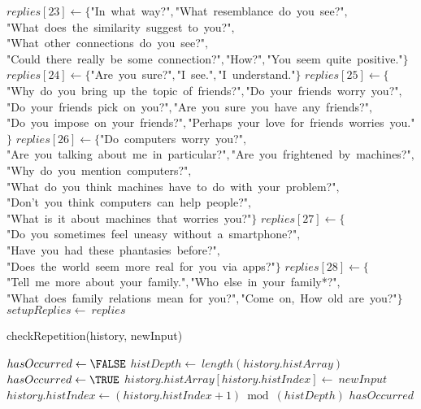 \documentclass[a4paper,10pt]{article}
\begin{document}
\begin{algorithm}
\begin{algorithmic}[5]
  \STATE \(replies[23]\gets\{\)"{}In\ what\ way?"{}\(,\)"{}What\ resemblance\ do\ you\ see?"{}\(,\)"{}What\ does\ the\ similarity\ suggest\ to\ you?"{}\(,\)"{}What\ other\ connections\ do\ you\ see?"{}\(,\)"{}Could\ there\ really\ be\ some\ connection?"{}\(,\)"{}How?"{}\(,\)"{}You\ seem\ quite\ positive."{}\(\}\)
  \STATE \(replies[24]\gets\{\)"{}Are\ you\ sure?"{}\(,\)"{}I\ see."{}\(,\)"{}I\ understand."{}\(\}\)
  \STATE \(replies[25]\gets\{\)"{}Why\ do\ you\ bring\ up\ the\ topic\ of\ friends?"{}\(,\)"{}Do\ your\ friends\ worry\ you?"{}\(,\)"{}Do\ your\ friends\ pick\ on\ you?"{}\(,\)"{}Are\ you\ sure\ you\ have\ any\ friends?"{}\(,\)"{}Do\ you\ impose\ on\ your\ friends?"{}\(,\)"{}Perhaps\ your\ love\ for\ friends\ worries\ you."{}\(\}\)
  \STATE \(replies[26]\gets\{\)"{}Do\ computers\ worry\ you?"{}\(,\)"{}Are\ you\ talking\ about\ me\ in\ particular?"{}\(,\)"{}Are\ you\ frightened\ by\ machines?"{}\(,\)"{}Why\ do\ you\ mention\ computers?"{}\(,\)"{}What\ do\ you\ think\ machines\ have\ to\ do\ with\ your\ problem?"{}\(,\)"{}Don'{}t\ you\ think\ computers\ can\ help\ people?"{}\(,\)"{}What\ is\ it\ about\ machines\ that\ worries\ you?"{}\(\}\)
  \STATE \(replies[27]\gets\{\)"{}Do\ you\ sometimes\ feel\ uneasy\ without\ a\ smartphone?"{}\(,\)"{}Have\ you\ had\ these\ phantasies\ before?"{}\(,\)"{}Does\ the\ world\ seem\ more\ real\ for\ you\ via\ apps?"{}\(\}\)
  \STATE \(replies[28]\gets\{\)"{}Tell\ me\ more\ about\ your\ family."{}\(,\)"{}Who\ else\ in\ your\ family*?"{}\(,\)"{}What\ does\ family\ relations\ mean\ for\ you?"{}\(,\)"{}Come\ on,\ How\ old\ are\ you?"{}\(\}\)
  \STATE \(setupReplies\gets\ replies\)

\end{algorithmic}
\end{algorithm}


\begin{algorithm}
\caption{checkRepetition(history, newInput)}
\begin{algorithmic}[5]

\STATE {}
\STATE {}
  \STATE \(hasOccurred\gets\FALSE\)
    \STATE \(histDepth\gets\ length(history.histArray)\)
        \STATE \(hasOccurred\gets\TRUE\)
      \ENDIF
    \ENDFOR
    \STATE \(history.histArray[history.histIndex]\gets\ newInput\)
    \STATE \(history.histIndex\gets(history.histIndex+1)\bmod(histDepth)\)
  \ENDIF
  \RETURN\(hasOccurred\)

\end{algorithmic}
\end{algorithm}
\end{document}
